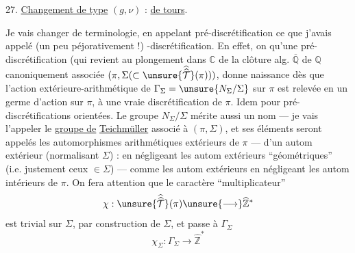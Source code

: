 
27. \uline{Changement de type} $(g,\nu)$ : \uline{ de tours}.

Je vais changer de terminologie, en appelant
pré-discrétification ce que j'avais appelé (un peu
péjorativement !) -discrétification. En effet, on
 qu'une pré-discrétification  (qui revient 
au plongement  dans $\mathbb C$ de la clôture alg. $\overline{\mathbb Q}$ de $\mathbb Q$
canoniquement associée  $(\pi,\Sigma(\subset\unsure{\widehat{\widehat{\mathcal T}}}(\pi)))$, donne
naissance dès que l'action extérieure-arithmétique de
$\Gamma_\Sigma=\unsure{N_\Sigma/\Sigma}$ sur $\pi$ est relevée en un germe d'action
sur $\pi$, à une vraie discrétification de $\pi$. Idem pour
pré-discrétifications orientées. Le groupe $N_\Sigma/\Sigma$ mérite
aussi un nom --- je vais l'appeler le \uline{groupe de}
\uline{Teichmüller}  associé à $(\pi,\Sigma)$, et
ses éléments seront appelés les automorphismes
arithmétiques extérieurs de $\pi$ ---  d'un
autom extérieur (normalisant $\Sigma$) : en négligeant les
autom extérieurs ``géométriques'' (i.e. justement ceux
$\in\Sigma$) ---  comme les autom extérieurs  
 en négligeant les autom intérieurs de $\pi$.
On  fera attention que le caractère ``multiplicateur''
\[
\chi:\unsure{\widehat{\widehat{\mathcal T}}}(\pi)\unsure{\longrightarrow}\widehat{\mathbb Z}^{*}
\]
est trivial sur $\Sigma$, par construction de $\Sigma$, et
passe à $\Gamma_\Sigma$
\[
\chi_\Sigma:\Gamma_\Sigma\longrightarrow\widehat{\mathbb Z}^{*}
\]
